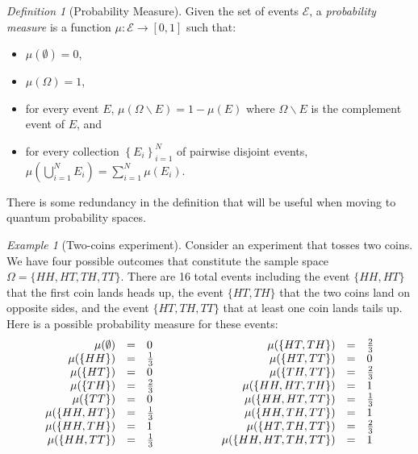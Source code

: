 \documentclass[12pt]{iopart}
\theoremstyle{remark}
\newtheorem{example}{Example}
\newtheorem{definition}{Definition}
\newcommand{\events}{\ensuremath{\mathcal{E}}}
\newcommand{\pmeas}{\ensuremath{\mu}}
\begin{document}
\begin{definition}[Probability Measure]\label{def:ClassicalProbabilitySpace}
  Given the set of events $\events$, a \emph{probability measure} is a
  function $\pmeas:\events\rightarrow[0,1]$ such that:
\begin{itemize}
\item $\pmeas(\emptyset)=0$,
\item $\pmeas(\Omega)=1$, 
\item for every event $E$,
  $\pmeas\left(\Omega\backslash E\right)=1-\pmeas\left(E\right)$ where
  $\Omega\backslash E$ is the complement event of $E$, and
\item for every collection $\left\{ E_{i}\right\} _{i=1}^{N}$ of
  pairwise disjoint events,
  $\pmeas\left(\bigcup_{i=1}^{N}E_{i}\right)=\sum_{i=1}^{N}\pmeas(E_{i})$.
\end{itemize}
\end{definition}
\noindent There is some redundancy in the definition that will be useful when
moving to quantum probability spaces. 

\begin{example}[Two-coins experiment]\label{ex1} Consider an
  experiment that tosses two coins. We have four possible outcomes
  that constitute the sample space $\Omega=\{HH,HT,TH,TT\}$. There are
  16 total events including the event $\{HH,HT\}$ that the first coin
  lands heads up, the event $\{HT,TH\}$ that the two coins land on
  opposite sides, and the event $\{HT,TH,TT\}$ that at least one coin
  lands tails up. Here is a possible probability measure for these
  events:
\begin{equation}
\begin{array}{c@{\qquad\qquad}c}
\begin{array}{rcl}
\pmeas(\emptyset) & = & 0\\
\pmeas(\{HH\}) & = & \frac{1}{3}\\
\pmeas(\{HT\}) & = & 0\\
\pmeas(\{TH\}) & = & \frac{2}{3}\\
\pmeas(\{TT\}) & = & 0\\
\pmeas(\{HH,HT\}) & = & \frac{1}{3}\\
\pmeas(\{HH,TH\}) & = & 1\\
\pmeas(\{HH,TT\}) & = & \frac{1}{3}
\end{array} & \begin{array}{rcl}
\pmeas(\{HT,TH\}) & = & \frac{2}{3}\\
\pmeas(\{HT,TT\}) & = & 0\\
\pmeas(\{TH,TT\}) & = & \frac{2}{3}\\
\pmeas(\{HH,HT,TH\}) & = & 1\\
\pmeas(\{HH,HT,TT\}) & = & \frac{1}{3}\\
\pmeas(\{HH,TH,TT\}) & = & 1\\
\pmeas(\{HT,TH,TT\}) & = & \frac{2}{3}\\
\pmeas(\{HH,HT,TH,TT\}) & = & 1
\end{array}\end{array}
\end{equation}
\end{example}
\end{document}
